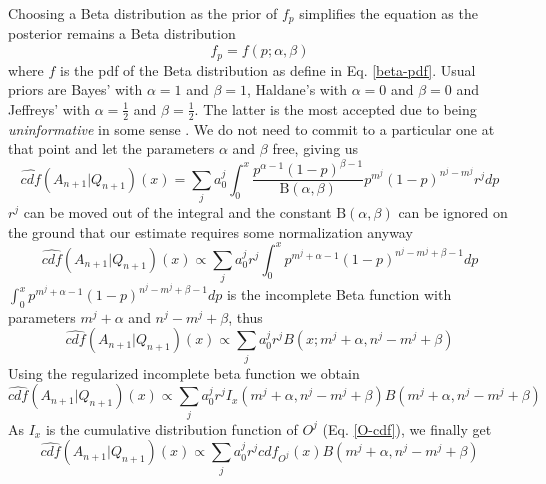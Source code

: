 \documentclass[runningheads]{llncs}
\begin{document}
Choosing a Beta distribution as the prior of $f_p$ simplifies the
equation as the posterior remains a Beta distribution
\begin{equation}
f_p = f(p; \alpha, \beta)
\end{equation}
where $f$ is the pdf of the Beta distribution as define in
Eq. \ref{beta-pdf}. Usual priors are Bayes' with $\alpha = 1$ and
$\beta = 1$, Haldane's with $\alpha = 0$ and $\beta = 0$ and Jeffreys'
with $\alpha = \frac{1}{2}$ and $\beta = \frac{1}{2}$. The latter is
the most accepted due to being \emph{uninformative} in some sense
\cite{Jeffreys46Invariant}. We do not need to commit to a particular
one at that point and let the parameters $\alpha$ and $\beta$ free,
giving us
\begin{equation}
  \label{betaconsol-1}
  \hat{cdf}(A_{n+1}|Q_{n+1})(x) = \sum_j a_0^j \int_0^x
  \frac{p^{\alpha - 1}(1-p)^{\beta - 1}}{\mathrm{B}(\alpha, \beta)}
  p^{m^j}(1-p)^{n^j-m^j} r^j dp
\end{equation}
$r^j$ can be moved out of the integral and the constant
$\mathrm{B}(\alpha, \beta)$ can be ignored on the ground that our
estimate requires some normalization anyway
\begin{equation}
  \label{betaconsol-2}
  \hat{cdf}(A_{n+1}|Q_{n+1})(x) \propto \sum_j a_0^j r^j
  \int_0^x p^{m^j+\alpha - 1}(1-p)^{n^j-m^j+\beta - 1} dp
\end{equation}
$\displaystyle\int_0^x p^{m^j+\alpha - 1}(1-p)^{n^j-m^j+\beta - 1} dp$
is the incomplete Beta function with parameters $m^j+\alpha$ and
$n^j-m^j+\beta$, thus
\begin{equation}
  \label{betaconsol-3}
  \hat{cdf}(A_{n+1}|Q_{n+1})(x) \propto \sum_j a_0^j r^j
  B(x; m^j+\alpha, n^j-m^j+\beta)
\end{equation}
Using the regularized incomplete beta function we obtain
\begin{equation}
  \label{betaconsol-4}
  \hat{cdf}(A_{n+1}|Q_{n+1})(x) \propto \sum_j a_0^j r^j
  I_x(m^j+\alpha, n^j-m^j+\beta)
  B(m^j+\alpha, n^j-m^j+\beta)
\end{equation}
As $I_x$ is the cumulative distribution function of $O^j$
(Eq. \ref{O-cdf}), we finally get
\begin{equation}
  \label{betaconsol-5}
  \hat{cdf}(A_{n+1}|Q_{n+1})(x) \propto \sum_j a_0^j r^j cdf_{O^j}(x)
  B(m^j+\alpha, n^j-m^j+\beta)
\end{equation}
\end{document}
